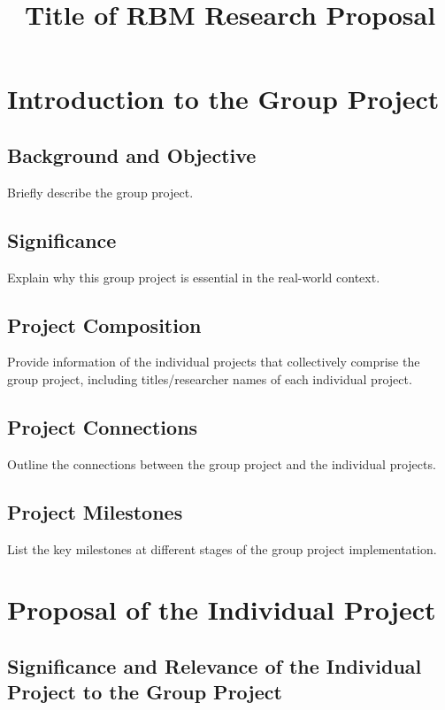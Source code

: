 \documentclass[12pt, a4paper]{article}
\title{Title of RBM Research Proposal}
\begin{document}


\setcounter{page}{2}
\tableofcontents
\newpage

\setcounter{page}{1}

\section{Introduction to the Group Project}

\subsection{Background and Objective}

Briefly describe the group project.


\subsection{Significance}

Explain why this group project is essential in the real-world context.


\subsection{Project Composition}

Provide information of the individual projects that collectively comprise the group
project, including titles/researcher names of each individual project.

\subsection{Project Connections}

Outline the connections between the group project and the individual projects.


\subsection{Project Milestones}

List the key milestones at different stages of the group project implementation.


\section{Proposal of the Individual Project}

\subsection{Significance and Relevance of the Individual Project to the Group Project}
\end{document}
